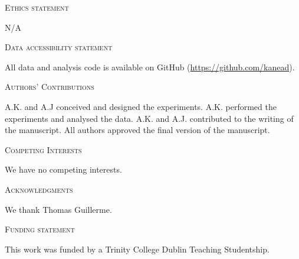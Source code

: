 \documentclass[12pt,letterpaper]{article}
\renewcommand{\section}[1]{%
\bigskip
\begin{center}
\begin{Large}
\normalfont\scshape #1
\medskip
\end{Large}
\end{center}}
\begin{document}
\section{Ethics statement}
N/A
\section{Data accessibility statement}
All data and analysis code is available on GitHub (\url{https://github.com/kanead}).
\section{Authors' Contributions}
A.K. and A.J conceived and designed the experiments. A.K. performed the experiments and analysed the data. A.K. and A.J. contributed to the writing of the manuscript. All authors approved the final version of the manuscript.
\section{Competing Interests}
We have no competing interests.
\section{Acknowledgments}
We thank Thomas Guillerme.
\section{Funding statement}
This work was funded by a Trinity College Dublin Teaching Studentship.




\end{document}

